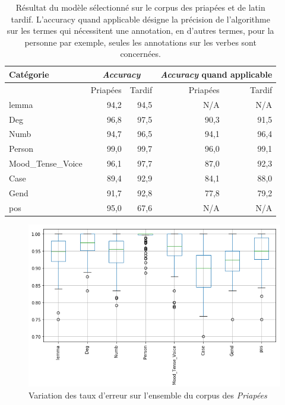 \begin{table}[h]
    \centering
    \begin{tabular}{l|rr|rr}
    \toprule
         Catégorie &  \multicolumn{2}{c}{\textit{Accuracy}} & \multicolumn{2}{c}{\textit{Accuracy} quand applicable} \\
    \midrule    
                {} &  Priapées &    Tardif                  & Priapées &    Tardif                                   \\
    \midrule
             lemma &     94,2 &    94,5                   &   N/A    &    N/A                                      \\
               Deg &     96,8 &    97,5                   &   90,3   &    91,5                                     \\
              Numb &     94,7 &    96,5                   &   94,1   &    96,4                                     \\
            Person &     99,0 &    99,7                   &   96,0   &    99,1                                     \\
Mood\_Tense\_Voice &     96,1 &    97,7                   &   87,0   &    92,3                                     \\
              Case &     89,4 &    92,9                   &   84,1   &    88,0                                     \\
              Gend &     91,7 &    92,8                   &   77,8   &    79,2                                     \\
               pos &     95,0 &    67,6                   &   N/A    &    N/A                                      \\
    \bottomrule
    \end{tabular}
    \caption{Résultat du modèle sélectionné sur le corpus des priapées et de latin tardif. L'accuracy quand applicable désigne la précision de l'algorithme sur les termes qui nécessitent une annotation, en d'autres termes, pour la personne par exemple, seules les annotations sur les verbes sont concernées.}
    \label{tab:out_of_domain_global_accuracy}
\end{table}


\begin{figure}[ht]
    \centering
    \includegraphics[width=0.7\linewidth]{figures/chap3/extensibilite/PriapeaBoxPlot.png}
    \caption{Variation des taux d'erreur sur l'ensemble du corpus des \textit{Priapées}}
    \label{fig:priapea_varations_boxplot}
\end{figure}

